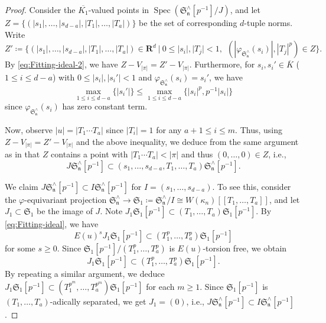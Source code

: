 \begin{proof}
Consider the $\overline{K_1}$-valued points in $\operatorname{Spec}(\mathfrak{S}_{\mathfrak{n}}^{\wedge}[p^{-1}]/J)$, and let $Z = \{(|s_1|, \ldots, |s_{d-a}|, |T_1|, \ldots, |T_a|)\}$ be the set of corresponding $d$-tuple norms. Write
\[
Z' \coloneqq \{ (|s_1|, \ldots, |s_{d-a}|, |T_1|, \ldots, |T_a|) \in \mathbf{R}^d ~|~ 0 \leq |s_i|, |T_j| < 1, ~~(|\varphi_{\mathfrak{S}_{\mathfrak{n}}^{\wedge}}(s_i)|, |T_j|^p) \in Z \}.
\]
By \eqref{eq:Fitting-ideal-2}, we have $Z-V_{|\pi|} = Z'-V_{|\pi|}$. Furthermore, for $s_i, s_i' \in \overline{K}$ ($1 \leq i \leq d-a$) with $0 \leq |s_i|, |s_i'| < 1$ and $\varphi_{\mathfrak{S}_{\mathfrak{n}}^{\wedge}}(s_i) = s_i'$, we have
\[
\max_{1 \leq i \leq d-a} \{|s_i'|\} \leq \max_{1 \leq i \leq d-a} \{|s_i|^p, p^{-1}|s_i| \}   
\]
since $\varphi_{\mathfrak{S}_{\mathfrak{n}}^{\wedge}}(s_i)$ has zero constant term.

Now, observe $|u| = |T_1\cdots T_a|$ since $|T_i| = 1$ for any $a+1 \leq i \leq m$. Thus, using $Z-V_{|\pi|} = Z'-V_{|\pi|}$ and the above inequality, we deduce from the same argument as in \cite[Lem.~4.12, Pf.]{du-liu-moon-shimizu-completed-prismatic-F-crystal-loc-system} that $Z$ contains a point with $|T_1 \cdots T_a| < |\pi|$ and thus $(0, \ldots, 0) \in Z$, i.e., 
\[
J\mathfrak{S}_{\mathfrak{n}}^{\wedge}[p^{-1}] \subset (s_1, \ldots, s_{d-a}, T_1, \ldots, T_a)\mathfrak{S}_{\mathfrak{n}}^{\wedge}[p^{-1}].
\]


We claim $J\mathfrak{S}_{\mathfrak{n}}^{\wedge}[p^{-1}] \subset I\mathfrak{S}_{\mathfrak{n}}^{\wedge}[p^{-1}]$ for $I = (s_1, \ldots, s_{d-a})$. To see this, consider the $\varphi$-equivariant projection $\mathfrak{S}_{\mathfrak{n}}^{\wedge} \rightarrow \mathfrak{S}_1 \coloneqq \mathfrak{S}_{\mathfrak{n}}^{\wedge} / I \cong W(\kappa_n)[\![T_1, \ldots, T_a]\!]$, and let $J_1 \subset \mathfrak{S}_1$ be the image of $J$. Note $J_1\mathfrak{S}_1[p^{-1}] \subset (T_1, \ldots, T_a)\mathfrak{S}_1[p^{-1}]$. By \eqref{eq:Fitting-ideal}, we have
\[
E(u)^s J_1\mathfrak{S}_1[p^{-1}] \subset (T_1^p, \ldots, T_a^p)\mathfrak{S}_1[p^{-1}]
\]
for some $s \geq 0$. Since $\mathfrak{S}_1[p^{-1}]/(T_1^p, \ldots, T_a^p)$ is $E(u)$-torsion free, we obtain
\[
J_1\mathfrak{S}_1[p^{-1}] \subset (T_1^p, \ldots, T_a^p)\mathfrak{S}_1[p^{-1}].
\]
By repeating a similar argument, we deduce $J_1\mathfrak{S}_1[p^{-1}] \subset (T_1^{p^m}, \ldots, T_a^{p^m})\mathfrak{S}_1[p^{-1}]$ for each $m \geq 1$. Since $\mathfrak{S}_1[p^{-1}]$ is $(T_1, \ldots, T_a)$-adically separated, we get $J_1 = (0)$, i.e., $J\mathfrak{S}_{\mathfrak{n}}^{\wedge}[p^{-1}] \subset I\mathfrak{S}_{\mathfrak{n}}^{\wedge}[p^{-1}]$. 


\end{proof}
